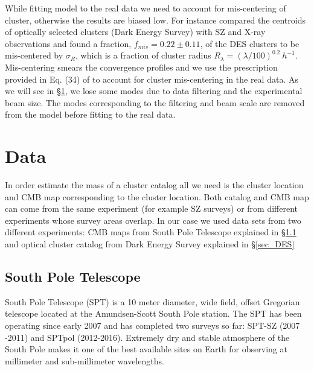 
While fitting model to the real data we need to account for mis-centering of cluster, otherwise the results are biased low. 
For instance \citet{rykoff16} compared the centroids of optically selected clusters (Dark Energy Survey) with SZ \citep{bleem15} and X-ray observations and found a fraction, $f_{mis} = 0.22 \pm 0.11$, of the DES clusters to be mis-centered by $\sigma_{R}$, which is a fraction of cluster radius $R_{\lambda} = (\lambda/100)^{0.2} \: h^{-1}$. Mis-centering smears the convergence profiles and we use the prescription provided in Eq. (34) of \citet{oguri11} to account for cluster mis-centering in the real data. %
As we will see in \S\ref{sec_data}, we lose some modes due to data filtering and the experimental beam size. The modes corresponding to the filtering and beam scale are removed from the model before fitting to the real data.
 
  
\section{Data}
\label{sec_data}
In order estimate the mass of a cluster catalog all we need is the cluster location and CMB map corresponding to the cluster location.
 Both catalog and CMB map can come from the same experiment (for example SZ surveys) or from different experiments whose survey areas overlap.
In our case we used data sets from two different experiments: CMB maps from South Pole Telescope explained in \S\ref{sec_SPT} and 
optical cluster catalog from Dark Energy Survey explained in \S\ref{sec_DES}

\subsection{South Pole Telescope}
\label{sec_SPT}
South Pole Telescope (SPT) is a 10 meter diameter, wide field, offset Gregorian telescope \citep[SPT,][]{ carlstrom11,padin08} located at the Amundsen-Scott South Pole station.
The SPT has been operating since early 2007 and has completed two surveys so far: SPT-SZ (2007 -2011) and SPTpol (2012-2016).  
Extremely dry and stable atmosphere of the South Pole makes it one of the best available sites on Earth for observing at millimeter and sub-millimeter wavelengths. 

